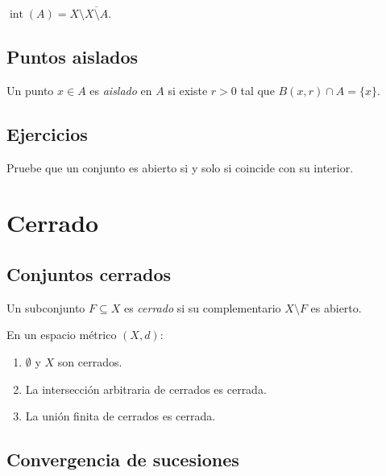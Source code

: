 \begin{proposition}
\label{prop:int-complemento}
$\operatorname{int}(A)=X\setminus\overline{X\setminus A}$.
\end{proposition}

\subsection{Puntos aislados}

\begin{definition}
\label{def:punto-aislado}
Un punto $x\in A$ es \emph{aislado} en $A$ si existe $r>0$ tal que $B(x,r)\cap A=\{x\}$.
\end{definition}

\subsection{Ejercicios}

\begin{exercise}
Pruebe que un conjunto es abierto si y solo si coincide con su interior.
\end{exercise}

\section{Cerrado}

\subsection{Conjuntos cerrados}

\begin{definition}
\label{def:cerrado}
Un subconjunto $F\subseteq X$ es \emph{cerrado} si su complementario $X\setminus F$ es abierto.
\end{definition}

\begin{proposition}
\label{prop:prop-cerrados}
En un espacio métrico $(X,d)$:
\begin{enumerate}
  \item[(i)] $\emptyset$ y $X$ son cerrados.
  \item[(ii)] La intersección arbitraria de cerrados es cerrada.
  \item[(iii)] La unión finita de cerrados es cerrada.
\end{enumerate}
\end{proposition}

\subsection{Convergencia de sucesiones}

